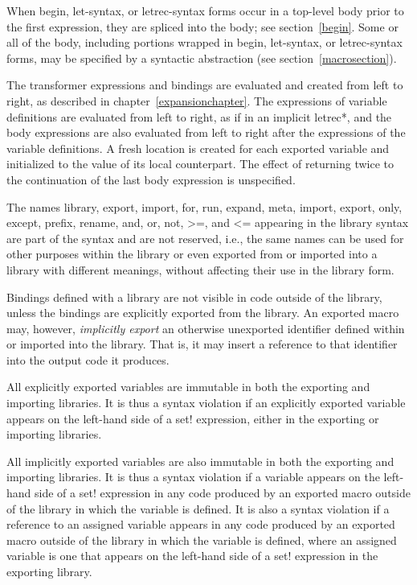 When {\cf begin}, {\cf let-syntax}, or {\cf letrec-syntax} forms
occur in a top-level body prior to the first
expression, they are spliced into the body; see section~\ref{begin}.
Some or all of the body, including portions wrapped in {\cf begin},
{\cf let-syntax}, or {\cf letrec-syntax}
forms, may be specified by a syntactic abstraction
(see section~\ref{macrosection}).

The transformer expressions and bindings are evaluated and created
from left to right, as described in chapter~\ref{expansionchapter}.
The expressions of variable definitions are evaluated
from left to right, as if in an implicit {\cf letrec*},
and the body expressions are also evaluated from left to right
after the expressions of the variable definitions.
A fresh location is created for each exported variable and initialized
to the value of its local counterpart.
The effect of returning twice to the continuation of the last body
expression is unspecified.

\begin{note}
The names {\cf library}, {\cf export}, {\cf import},
{\cf for}, {\cf run}, {\cf expand}, {\cf meta},
{\cf import}, {\cf export}, {\cf only}, {\cf except}, {\cf
  prefix}, {\cf rename}, {\cf and}, {\cf or}, {\cf not}, {\cf >=}, and {\cf <=}
appearing in the library syntax are part of the
syntax and are not reserved, i.e., the same names can be used for other
purposes within the library or even exported from or imported
into a library with different meanings, without affecting their
use in the {\cf library} form.
\end{note}

Bindings defined with a library are not visible in code
outside of the library, unless the bindings are explicitly exported from the
library.
An exported macro may, however, \emph{implicitly export} an otherwise
unexported identifier defined within or imported into the library.
That is, it may insert a reference to that identifier into the output code
it produces.

\label{importsareimmutablesection}
All explicitly exported variables are immutable in both the
exporting and importing libraries.
It is thus a syntax violation if an
explicitly exported variable appears on the left-hand side of a {\cf set!}
expression, either in the exporting or importing libraries.

All implicitly exported variables are also immutable in both the
exporting and importing libraries.
It is thus a syntax violation if a
variable appears on the left-hand side of a {\cf set!}
expression in any code produced by an exported macro outside of the
library in which the variable is defined.
It is also a syntax violation if a
reference to an assigned variable appears in any code produced by
an exported macro outside of the library in which the variable is defined,
where an assigned variable is one that appears on the left-hand
side of a {\cf set!} expression in the exporting library.


